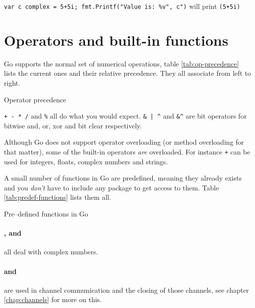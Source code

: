 \lstinline{var c complex = 5+5i; fmt.Printf("Value is: %v", c")}\newline
will print\newline
\indent\lstinline{(5+5i)}

\section{Operators and built-in functions}
Go supports the normal set of numerical operations,
table \ref{tab:op-precedence}
lists the current ones and their relative precedence. They
all associate from left to right.

\begin{table}[H]
\begin{center}
\caption{Operator precedence}
\label{tab:op-precedence}

\end{center}
\end{table}
\verb|+ - * /| and \verb|%| all do what you would expect. 
\verb!& | ^!
and \verb!&^! are bit operators for bitwise and, or, xor and bit clear 
respectively.

Although Go does not support operator overloading (or method
overloading for that matter), some of the built-in
operators \emph{are} overloaded. For instance \texttt{+} can be used for integers,
floats, complex numbers and strings.\hfill

A small number of functions in Go are predefined, meaning they already
exists and you \emph{don't} have to include any package to get
access to them. Table \ref{tab:predef-functions} lists them all.

\begin{table}[H]
\begin{center}
\caption{Pre--defined functions in Go}
\label{tab:predef-functions}

\end{center}
\end{table}

\paragraph{,  and } all deal with
complex numbers.

\paragraph{ and } are used in
channel communication and the closing of those channels, see chapter \ref{chap:channels}
for more on this.

